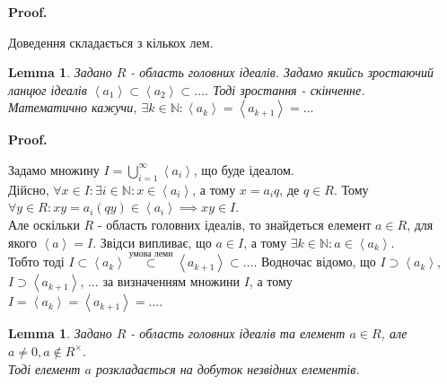 \documentclass[a4paper, 14pt]{extarticle}
\makeatletter
\theoremstyle{theoremdd}
\theoremstyle{theoremdd}
\theoremstyle{theoremdd}
\theoremstyle{theoremdd}
\theoremstyle{theoremdd}
\theoremstyle{theoremdd}
\theoremstyle{theoremdd}
\newtheorem{lemma}[theorem]{Lemma}
\theoremstyle{theoremdd}
\def\qed{$\blacksquare$}
\renewenvironment{proof}[1][Proof.\\]{\par
\pushQED{\hfill \qed}%
\normalfont \topsep6\p@\@plus6\p@\relax
\trivlist
\item\relax
{\bfseries
#1\@addpunct{.}}\hspace\labelsep\ignorespaces
}{%
\popQED\endtrivlist\@endpefalse
}
\makeatother
\begin{document}
\begin{proof}
Доведення складається з кількох лем.
\begin{lemma}
Задано $R$ - область головних ідеалів. Задамо якийсь зростаючий ланцюг ідеалів $\left< a_1 \right> \subset \left< a_2 \right> \subset \dots$. Тоді зростання - скінченне.\\
Математично кажучи, $\exists k \in \mathbb{N}: \left<a_k \right> = \left< a_{k+1} \right> = \dots$
\end{lemma}

\begin{proof}
Задамо множину $I = \displaystyle\bigcup_{ i =1}^\infty \left< a_i \right>$, що буде ідеалом.\\
Дійсно, $\forall x \in I: \exists i \in \mathbb{N}: x \in \left< a_i \right>$, а тому $x = a_i q$, де $q \in R$. Тому $\forall y \in R: xy = a_i(qy) \in \left< a_i \right> \implies xy \in I$.\\
Але оскільки $R$ - область головних ідеалів, то знайдеться елемент $a \in R$, для якого $\left< a \right> = I$. Звідси випливає, що $a \in I$, а тому $\exists k \in \mathbb{N}: a \in \left< a_k \right>$.\\
Тобто тоді $I \subset \left< a_k \right> \overset{\text{умова леми}}{\subset} \left< a_{k+1} \right> \subset \dots$. Водночас відомо, що $I \supset \left< a_k \right>$, $I \supset \left< a_{k+1} \right>$, $\dots$ за визначенням множини $I$, а тому \\ $I = \left< a_k \right> = \left< a_{k+1} \right> = \dots$.
\end{proof}

\begin{lemma}
Задано $R$ - область головних ідеалів та елемент $a \in R$, але $a \neq 0, a \not \in R^\times$.\\
Тоді елемент $a$ розкладається на добуток незвідних елементів.
\end{lemma}


\end{proof}
\end{document}
